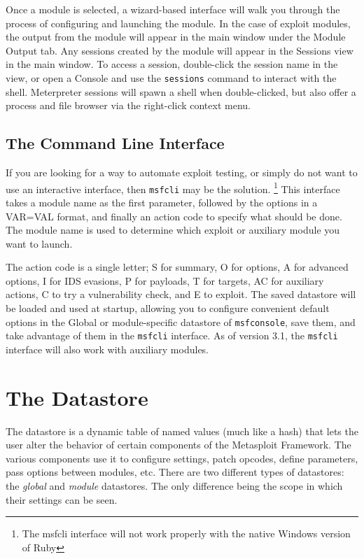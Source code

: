 \documentclass{report}
\begin{document}
\par
Once a module is selected, a wizard-based interface will walk you through the
process of configuring and launching the module. In the case of exploit modules,
the output from the module will appear in the main window under the Module
Output tab. Any sessions created by the module will appear in the Sessions view
in the main window. To access a session, double-click the session name in the
view, or open a Console and use the \texttt{sessions} command to interact with
the shell. Meterpreter sessions will spawn a shell when double-clicked, but also
offer a process and file browser via the right-click context menu.

    \section{The Command Line Interface}
    \label{STARTED-CLI}

\par
If you are looking for a way to automate exploit testing, or simply do not want
to use an interactive interface, then \texttt{msfcli} may be the solution.
\footnote{The msfcli interface will not work properly with the native Windows
version of Ruby} This interface takes a module name as the first parameter,
followed by the options in a VAR=VAL format, and finally an action code to
specify what should be done. The module name is used to determine which exploit
or auxiliary module you want to launch.

\par
The action code is a single letter; S for summary, O for options, A for advanced
options, I for IDS evasions, P for payloads, T for targets, AC for auxiliary
actions, C to try a vulnerability check, and E to exploit. The saved datastore
will be loaded and used at startup, allowing you to configure convenient default
options in the Global or module-specific datastore of \texttt{msfconsole}, save
them, and take advantage of them in the \texttt{msfcli} interface. As of version
3.1, the \texttt{msfcli} interface will also work with auxiliary modules.

\pagebreak

\chapter{The Datastore}

\par
The datastore is a dynamic table of named values (much like a hash) that lets
the user alter the behavior of certain components of the Metasploit Framework.
The various components use it to configure settings, patch opcodes, define
parameters, pass options between modules, etc. There are two different types of
datastores: the \textit{global} and \textit{module} datastores. The only
difference being the scope in which their settings can be seen.
\end{document}
